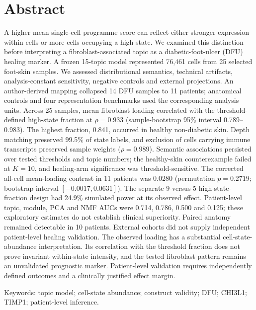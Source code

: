 \documentclass[10pt,a4paper]{article}
\begin{document}
\section*{Abstract}
\noindent A higher mean single-cell programme score can reflect either stronger expression within cells or more cells occupying a high state. We examined this distinction before interpreting a fibroblast-associated topic as a diabetic-foot-ulcer (DFU) healing marker.
A frozen 15-topic model represented 76,461 cells from 25 selected foot-skin samples. We assessed distributional semantics, technical artifacts, analysis-constant sensitivity, negative controls and external projections. An author-derived mapping collapsed 14 DFU samples to 11 patients; anatomical controls and four representation benchmarks used the corresponding analysis units.
Across 25 samples, mean fibroblast loading correlated with the threshold-defined high-state fraction at $\rho=0.933$ (sample-bootstrap 95\% interval 0.789--0.983). The highest fraction, 0.841, occurred in healthy non-diabetic skin. Depth matching preserved 99.5\% of state labels, and exclusion of cells carrying immune transcripts preserved sample weights ($\rho=0.989$). Semantic associations persisted over tested thresholds and topic numbers; the healthy-skin counterexample failed at $K=10$, and healing-arm significance was threshold-sensitive. The corrected all-cell mean-loading contrast in 11 patients was 0.0280 (permutation $p=0.2719$; bootstrap interval $[-0.0017,0.0631]$). The separate 9-versus-5 high-state-fraction design had 24.9\% simulated power at its observed effect. Patient-level topic, module, PCA and NMF AUCs were 0.714, 0.786, 0.500 and 0.125; these exploratory estimates do not establish clinical superiority. Paired anatomy remained detectable in 10 patients. External cohorts did not supply independent patient-level healing validation.
The observed loading has a substantial cell-state-abundance interpretation. Its correlation with the threshold fraction does not prove invariant within-state intensity, and the tested fibroblast pattern remains an unvalidated prognostic marker. Patient-level validation requires independently defined outcomes and a clinically justified effect margin.
\par\smallskip\noindent Keywords: topic model; cell-state abundance; construct validity; DFU; CHI3L1; TIMP1; patient-level inference.
\end{document}
